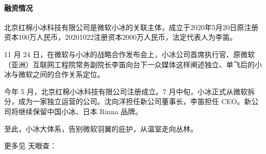 \documentclass[letterpaper,11pt,english]{sphinxmanual}
\begin{document}
\paragraph{融资情况}
\label{\detokenize{chapter_company/xiaoice:id8}}
北京红棉小冰科技有限公司是微软小冰的关联主体，成立于2020年5月20日原注册资本100万人民币，2020\sphinxhyphen{}10\sphinxhyphen{}22注册资本2000万人民币，法定代表人为李笛。%
\begin{footnote}[937]\sphinxAtStartFootnote
{}
%
\end{footnote}

11 月 24
日，在微软与小冰的战略合作发布会上，小冰公司首席执行官、原微软（亚洲）互联网工程院常务副院长李笛向台下一众媒体这样阐述独立、单飞后的小冰与微软之间的合作关系定位。

今年 5 月，北京红棉小冰科技有限公司注册成立。7
月中旬，小冰正式从微软拆分，成为一家独立运营的公司。沈向洋担任新公司董事长，李笛担任
CEO。新公司将继续保留中国小冰、日本 Rinna 品牌。

至此，小冰大体系，告别微软羽翼的庇护，从温室走向丛林。

更多见 天眼查：
\end{document}
